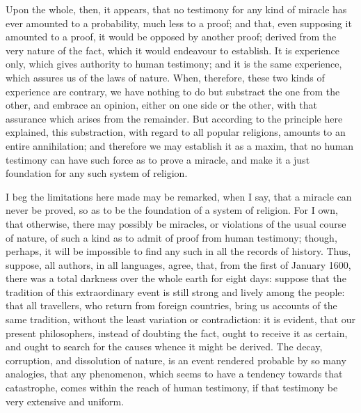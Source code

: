 \documentclass[]{article}
\begin{document}
\begin{sectionbody}
\humeparagraph  Upon the whole, then, it appears, that no testimony for any kind of miracle has ever amounted to a probability, much less to a proof; and that, even supposing it amounted to a proof, it would be opposed by another proof; derived from the very nature of the fact, which it would endeavour to establish. It is experience only, which gives authority to human testimony; and it is the same experience, which assures us of the laws of nature. When, therefore, these two kinds of experience are contrary, we have nothing to do but substract the one from the other, and embrace an opinion, either on one side or the other, with that assurance which arises from the remainder. But according to the principle here explained, this substraction, with regard to all popular religions, amounts to an entire annihilation; and therefore we may establish it as a maxim, that no human testimony can have such force as to prove a miracle, and make it a just foundation for any such system of religion.

\humeparagraph  I beg the limitations here made may be remarked, when I say, that a miracle can never be proved, so as to be the foundation of a system of religion. For I own, that otherwise, there may possibly be miracles, or violations of the usual course of nature, of such a kind as to admit of proof from human testimony; though, perhaps, it will be impossible to find any such in all the records of history. Thus, suppose, all authors, in all languages, agree, that, from the first of January 1600, there was a total darkness over the whole earth for eight days: suppose that the tradition of this extraordinary event is still strong and lively among the people: that all travellers, who return from foreign countries, bring us accounts of the same tradition, without the least variation or contradiction: it is evident, that our present philosophers, instead of doubting the fact, ought to receive it as certain, and ought to search for the causes whence it might be derived. The decay, corruption, and dissolution of nature, is an event rendered probable by so many analogies, that any phenomenon, which seems to have a tendency towards that catastrophe, comes within the reach of human testimony, if that testimony be very extensive and uniform.


\end{sectionbody}
\end{document}
